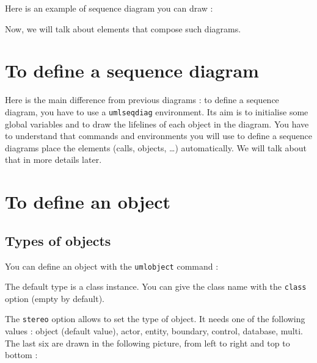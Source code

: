\documentclass[a4paper,11pt]{report}
\newcommand{\inputTikZ}[1]{%
  }%
\newcommand{\inputTikZ}[1]{%
    \texttt{[image: fig/\#1.pdf]}%
  }%
\begin{document}
Here is an example of sequence diagram you can draw :

\begin{center}
\inputTikZ{seqdiagex}
\end{center}

Now, we will talk about elements that compose such diagrams.

\section{To define a sequence diagram}\label{s.seqdiag}

Here is the main difference from previous diagrams : to define a sequence diagram, you have to use a {\tt umlseqdiag} environment.
Its aim is to initialise some global variables and to draw the lifelines of each object in the diagram. You have to understand that commands and environments you will use to define a sequence diagrams place the elements (calls, objects, \ldots ) automatically. We will talk about that in more details later.

\section{To define an object}\label{s.objs}

\subsection{Types of objects}\label{ss.obj}

You can define an object with the {\tt umlobject} command :

\medskip

\begin{minipage}{0.5\textwidth}

\end{minipage}
\begin{minipage}{0.5\textwidth}
\begin{center}
\inputTikZ{object}
\end{center}
\end{minipage}

\medskip

The default type is a class instance. You can give the class name with the {\tt class} option (empty by default).

\medskip

The {\tt stereo} option allows to set the type of object. It needs one of the following values : object (default value), actor, entity, boundary, control, database, multi. The last six are drawn in the following picture, from left to right and top to bottom :
\end{document}
